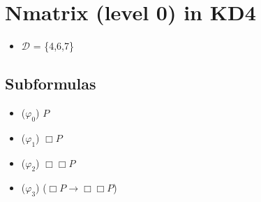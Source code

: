 \documentclass[
  14pt,
]{extarticle}
\author{}
\date{}
\providecommand{\tightlist}{%
  \setlength{\itemsep}{0pt}\setlength{\parskip}{0pt}}
\begin{document}
\hypertarget{nmatrix-level-0-in-kd4}{%
\section{Nmatrix (level 0) in KD4}\label{nmatrix-level-0-in-kd4}}

\begin{itemize}
\tightlist
\item
  \(\mathcal{D}\) = \{4,6,7\}
\end{itemize}

\hypertarget{subformulas}{%
\subsection{Subformulas}\label{subformulas}}

\begin{itemize}
\tightlist
\item
  (\(\varphi_{0}\)) \(P\)
\item
  (\(\varphi_{1}\)) \(\Box\)\(P\)
\item
  (\(\varphi_{2}\)) \(\Box\)\(\Box\)\(P\)
\item
  (\(\varphi_{3}\)) (\(\Box\)\(P\)\(\to\)\(\Box\)\(\Box\)\(P\))
\end{itemize}
\end{document}
